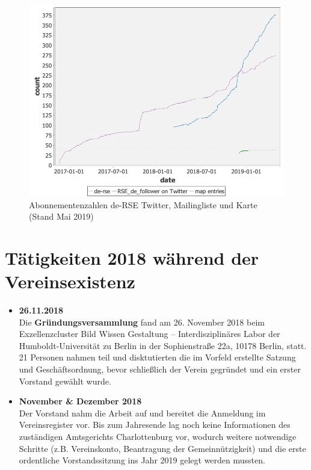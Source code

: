 \begin{figure}[htb]
  \centering
  \includegraphics[width=.95\textwidth]{2019_05_mailinglist_counter}
  \caption{Abonnementenzahlen de-RSE Twitter, Mailingliste und Karte (Stand Mai 2019) \label{fig:abo201905}}
\end{figure}

\clearpage
\section{Tätigkeiten 2018 während der Vereinsexistenz}

\begin{itemize}
 \item \textbf{26.11.2018}\\
  Die \textbf{Gründungsversammlung} fand am 26. November 2018 beim Exzellenzcluster Bild Wissen Gestaltung -- Interdisziplinäres Labor der Humboldt-Universität zu Berlin in der Sophienstraße 22a, 10178 Berlin, statt.
  21 Personen nahmen teil und disktutierten die im Vorfeld erstellte Satzung und Geschäftsordnung, bevor schließlich der Verein gegründet und ein erster Vorstand gewählt wurde.
 \item \textbf{November \& Dezember 2018}\\
  Der Vorstand nahm die Arbeit auf und bereitet die Anmeldung im Vereinsregister vor.
  Bis zum Jahresende lag noch keine Informationen des zuständigen Amtsgerichts Charlottenburg vor, wodurch weitere notwendige Schritte (z.B. Vereinskonto, Beantragung der Gemeinnützigkeit) und die erste ordentliche Vorstandssitzung ins Jahr 2019 gelegt werden mussten.
\end{itemize}





